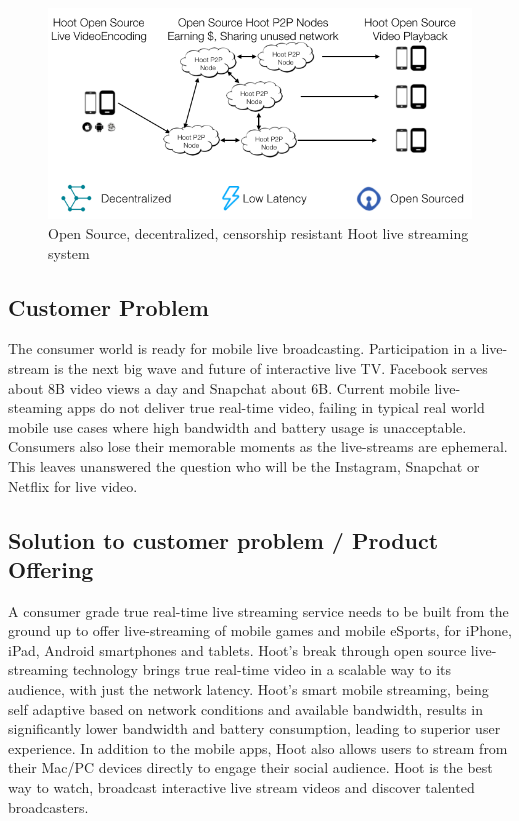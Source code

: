 \documentclass{article}
\begin{document}
\begin{figure}[h!]
  \centering
  \includegraphics[width=1.0\textwidth]{hoot-solution}
  \caption{Open Source, decentralized, censorship resistant Hoot live streaming system}
  \label{image:hoot-solution}
\end{figure}

\subsection{Customer Problem}
The consumer world is ready for mobile live broadcasting. Participation in a live-stream is the next big wave and future of interactive live TV. Facebook serves about 8B video views a day and Snapchat about 6B. Current mobile live-steaming apps do not deliver true real-time video, failing in typical real world mobile use cases where high bandwidth and battery usage is unacceptable. Consumers also lose their memorable moments as the live-streams are ephemeral. This leaves unanswered the question who will be the Instagram, Snapchat or Netflix for live video.


\subsection{Solution to customer problem / Product Offering}
A consumer grade true real-time live streaming service needs to be
built from the ground up to offer live-streaming of mobile games and
mobile eSports, for iPhone, iPad, Android smartphones and
tablets. Hoot's break through open source live-streaming technology brings true real-time video in a scalable way to its audience, with just the network latency. Hoot's smart mobile streaming, being self adaptive based on network conditions and available bandwidth, results in significantly lower bandwidth and battery consumption, leading to superior user experience. In addition to the mobile apps, Hoot also allows users to stream from their Mac/PC devices directly to engage their social audience. Hoot is the best way to watch, broadcast interactive live stream videos and discover talented broadcasters.
\end{document}
